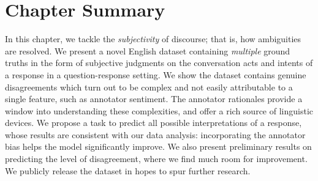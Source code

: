 \section{Chapter Summary}

In this chapter, we tackle the \emph{subjectivity} of discourse; that is, how ambiguities are resolved. We present a novel English dataset containing \emph{multiple} ground truths in the form of subjective judgments on the conversation acts and intents of a response in a question-response setting. We show the dataset contains genuine disagreements which turn out to be complex and not easily attributable to a single feature, such as annotator sentiment. The annotator rationales provide a window into understanding these complexities, and offer a rich source of linguistic devices. We propose a task to predict all possible interpretations of a response, whose results are consistent with our data analysis: incorporating the annotator bias helps the model significantly improve. We also present preliminary results on predicting the level of disagreement, where we find much room for improvement. We publicly release the dataset in hopes to spur further research.

